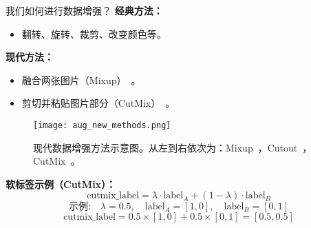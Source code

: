 \begin{refsection}
  \begin{frame}{我们如何进行数据增强？}
    \textbf{经典方法：}
      \begin{itemize}
        \item 翻转、旋转、裁剪、改变颜色等。
      \end{itemize}
      \textbf{现代方法：}
      \begin{itemize}
        \item 融合两张图片（Mixup）~\parencite{zhangMixupEMPIRICALRISK2018}。
        \item 剪切并粘贴图片部分（CutMix）~\parencite{yunCutMixRegularizationStrategy2019}。
      \end{itemize}
    \begin{minipage}{0.58\linewidth}
      \begin{figure}
        \centering
        \texttt{[image: aug\_new\_methods.png]}
        \caption[]{\scriptsize 现代数据增强方法示意图。从左到右依次为：Mixup~\parencite{zhangMixupEMPIRICALRISK2018}，Cutout~\parencite{devriesImprovedRegularizationConvolutional2017}，CutMix~\parencite{yunCutMixRegularizationStrategy2019}。}
      \end{figure}
    \end{minipage}
    \hfill
    \begin{minipage}{0.4\linewidth}
      \textbf{软标签示例（CutMix）：}
      \tiny
      \begin{equation*}
        \text{cutmix\_label} = \lambda \cdot \text{label}_A + (1 - \lambda) \cdot \text{label}_B
      \end{equation*}
      \vspace{-0.5em}
      \begin{equation*}
        \text{示例:} \quad \lambda = 0.5, \quad \text{label}_A = [1, 0], \quad \text{label}_B = [0, 1]
      \end{equation*}
      \vspace{-0.5em}
      \begin{equation*}
        \text{cutmix\_label} = 0.5 \times [1, 0] + 0.5 \times [0, 1] = [0.5, 0.5]
      \end{equation*}
     
  
    \end{minipage}
    \bottomleftrefs
  \end{frame}
  \end{refsection}
  

